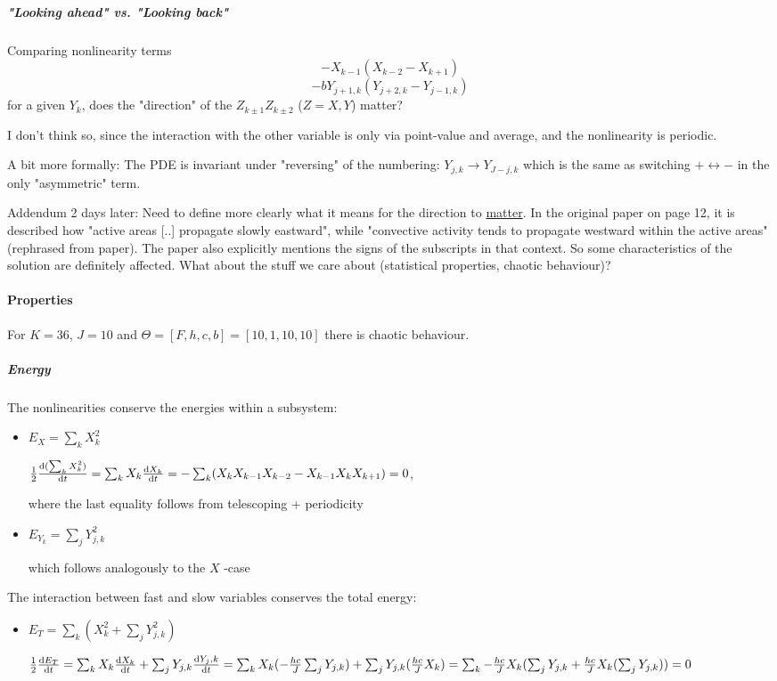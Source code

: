\documentclass[11pt]{article}
\begin{document}
\subparagraph{"Looking ahead" vs. "Looking back"}
\label{sec:org31e5d53}
Comparing nonlinearity terms
$$-X_{k-1}(X_{k-2} - X_{k+1})$$
$$-bY_{j+1,k}(Y_{j+2,k} - Y_{j-1, k})$$
for a given \(Y_{k}\), does the "direction" of the \(Z_{k\pm 1}Z_{k\pm 2}\) (\(Z=X,Y\)) matter?

I don't think so, since the interaction with the other variable is only via point-value
and average, and the nonlinearity is periodic.

A bit more formally:
The PDE is invariant under "reversing" of the numbering:
\(Y_{j,k} \rightarrow Y_{J-j,k}\) which is the same as switching \(+ \leftrightarrow -\) in
the only "asymmetric" term.

Addendum 2 days later: Need to define more clearly what it means for the direction to
\uline{matter}. In the original paper on page 12, it is described how "active areas [..] propagate
slowly eastward", while "convective activity tends to propagate westward within the active
areas" (rephrased from paper). The paper also explicitly mentions the signs of the subscripts
in that context. So some characteristics of the solution are definitely affected.
What about the stuff we care about (statistical properties, chaotic behaviour)?


\paragraph{Properties}
\label{sec:orga38a480}

For \(K=36\), \(J=10\) and \(\Theta = [F, h, c, b] = [10, 1, 10, 10]\) there is chaotic behaviour.

\subparagraph{Energy}
\label{sec:org5a340f4}

The nonlinearities conserve the energies within a subsystem:
\begin{itemize}
\item \(E_X = \sum_k X_k^2\)

\(\frac{1}{2} \dv{(\sum_k X_k^2)}{t} =
         \sum_k X_k \dv{X_k}{t} =
         -\sum_k (X_k X_{k-1} X_{k-2} - X_{k-1} X_{k} X_{k+1}) =
         0\),

where the last equality follows from telescoping + periodicity
\item \(E_{Y_k} = \sum_j Y_{j,k}^2\)

which follows analogously to the \(X\) -case
\end{itemize}

The interaction between fast and slow variables conserves the total energy:
\begin{itemize}
\item \(E_{T} = \sum_k (X_k^2 + \sum_j Y_{j,k}^2)\)

\(\frac{1}{2} \dv{E_{T}}{t} =
         \sum_k X_k \dv{X_k}{t} + \sum_j Y_{j,k} \dv{Y_j,k}{t} =
         \sum_k X_k (- \frac{hc}{J} \sum_j Y_{j,k}) + \sum_j Y_{j,k} (\frac{hc}{J} X_k) =
         \sum_k - \frac{hc}{J} X_k (\sum_j Y_{j,k} + \frac{hc}{J} X_k (\sum_j Y_{j,k})) = 
         0\)
\end{itemize}
\end{document}
